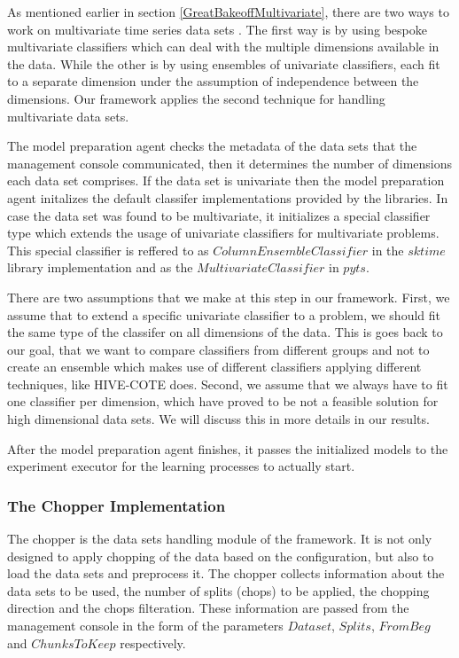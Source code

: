 As mentioned earlier in section \ref{GreatBakeoffMultivariate}, there are two ways to work on multivariate time series data sets \cite{ruiz2020great}.
The first way is by using bespoke multivariate classifiers which can deal with the multiple dimensions available in the data.
While the other is by using ensembles of univariate classifiers, each fit to a separate dimension under the assumption of independence between the dimensions.
Our framework applies the second technique for handling multivariate data sets.

The model preparation agent checks the metadata of the data sets that the management console communicated, then it determines the number of dimensions each data set comprises.
If the data set is univariate then the model preparation agent initalizes the default classifer implementations provided by the libraries.
In case the data set was found to be multivariate, it initializes a special classifier type which extends the usage of univariate classifiers for multivariate problems.
This special classifier is reffered to as $ColumnEnsembleClassifier$ in the $sktime$ library implementation and as the $MultivariateClassifier$ in $pyts$.

There are two assumptions that we make at this step in our framework.
First, we assume that to extend a specific univariate classifier to a problem, we should fit the same type of the classifer on all dimensions of the data.
This is goes back to our goal, that we want to compare classifiers from different groups and not to create an ensemble which makes use of different classifiers
applying different techniques, like HIVE-COTE does.
Second, we assume that we always have to fit one classifier per dimension, which have proved to be not a feasible solution for high dimensional data sets.
We will discuss this in more details in our results.

After the model preparation agent finishes, it passes the initialized models to the experiment executor for the learning processes to actually start.


\subsubsection*{The Chopper Implementation}
\label{ChopperImplementation}
The chopper is the data sets handling module of the framework.
It is not only designed to apply chopping of the data based on the configuration, but also to load the data sets and preprocess it.
The chopper collects information about the data sets to be used, the number of splits (chops) to be applied, the chopping direction and the chops filteration.
These information are passed from the management console in the form of the parameters $Dataset$, $Splits$, $FromBeg$ and $ChunksToKeep$ respectively.

